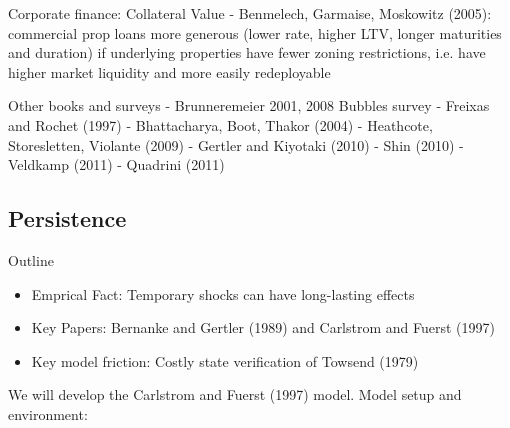 \documentclass[12pt]{article}
\theoremstyle{plain}
\theoremstyle{definition}
\theoremstyle{remark}
\begin{document}
Corporate finance: Collateral Value
- Benmelech, Garmaise, Moskowitz (2005): commercial prop loans more
generous (lower rate, higher LTV, longer maturities and duration) if
underlying properties have fewer zoning restrictions, i.e. have higher
market liquidity and more easily redeployable

Other books and surveys
- Brunneremeier 2001, 2008 Bubbles survey
- Freixas and Rochet (1997)
- Bhattacharya, Boot, Thakor (2004)
- Heathcote, Storesletten, Violante (2009)
- Gertler and Kiyotaki (2010)
- Shin (2010)
- Veldkamp (2011)
- Quadrini (2011)

\clearpage
\subsection{Persistence}

Outline
\begin{itemize}
  \item Emprical Fact: Temporary shocks can have long-lasting effects
  \item Key Papers:
    Bernanke and Gertler (1989) and Carlstrom and Fuerst (1997)
  \item Key model friction: Costly state verification of Towsend (1979)
\end{itemize}
We will develop the Carlstrom and Fuerst (1997) model.
Model setup and environment:
\end{document}
